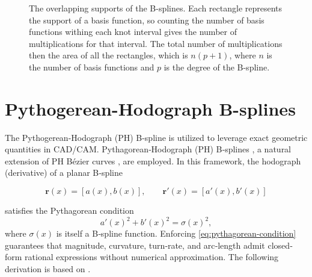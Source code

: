 \begin{figure}
    \centering
    
    \caption{The overlapping supports of the B-splines. Each rectangle represents the support of a basis function, so counting the number of basis functions withing each knot interval gives the number of multiplications for that interval. The total number of multiplications then the area of all the rectangles, which is $n(p+1)$, where $n$ is the number of basis functions and $p$ is the degree of the B-spline.}
    \label{fig:overlapping-bases}
\end{figure}


\section{Pythogerean-Hodograph B-splines}\label{sec:pythogerean-hodograph}
The Pythogerean-Hodograph (PH) B-spline is utilized to leverage exact geometric quantities in CAD/CAM. Pythagorean‐Hodograph (PH) B‐splines \cite{Albrecht2016}, a natural extension of PH Bézier curves \cite{Farouki1990}, are employed. In this framework, the hodograph (derivative) of a planar B‐spline

\begin{equation*}
\mathbf r(x) = [a(x), b(x)],
\qquad
\mathbf r'(x) = [a'(x), b'(x)]
\end{equation*}

satisfies the Pythagorean condition
\begin{equation}\label{eq:pythagorean-condition}
a'(x)^2 + b'(x)^2 = \sigma(x)^2,
\end{equation}
where $\sigma(x)$ is itself a B‐spline function. Enforcing \cref{eq:pythagorean-condition} guarantees that magnitude, curvature, turn‐rate, and arc‐length admit closed‐form rational expressions without numerical approximation. The following derivation is based on \cite{Albrecht2016}.

